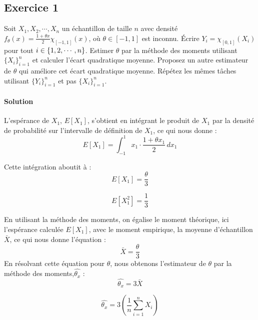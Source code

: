 \documentclass[../main.tex]{subfiles}
\begin{document}
\begin{CJK*}{UTF8}{gbsn}

\section*{Exercice 1}

Soit $X_1, X_2, \cdots, X_n$ un échantillon de taille $n$ avec densité 
$f_{\theta}(x) = \frac{1 + \theta x}{2} \chi_{[-1,1]}(x)$, 
où $\theta \in [-1,1]$ est inconnu. Écrire $Y_i = \chi_{[0,1]}(X_i)$
pour tout $i \in \left \{  1, 2, \cdots, n \right \}$.
Estimer $\theta$ par la méthode des moments utilisant $\{X_i\}_{i=1}^n$ et 
calculer l'écart quadratique moyenne. 
Proposez un autre estimateur de $\theta$ qui améliore cet écart quadratique moyenne.
Répétez les mêmes tâches utilisant $\{Y_i\}_{i=1}^n$ et pas $\{X_i\}_{i=1}^n$.

\paragraph{Solution}

L'espérance de $X_1$, $E[X_1]$, s'obtient en intégrant le produit de $X_1$ par la densité de probabilité sur l'intervalle de définition de $X_1$, ce qui nous donne :
\begin{equation*}
E[X_1] = \int_{-1}^{1} x_1 \cdot \frac{1 + \theta x_1}{2} \, dx_1
\end{equation*}

Cette intégration aboutit à :
\begin{equation*}
E[X_1] = \frac{\theta}{3} 
\end{equation*}

\begin{equation*}
E[X_1^2] = \frac{1}{3} 
\end{equation*}

En utilisant la méthode des moments, on égalise le moment théorique, 
ici l'espérance calculée $E[X_1]$, 
avec le moment empirique, la moyenne d'échantillon $\bar{X}$, ce qui nous donne l'équation :
\begin{equation*}
\bar{X} = \frac{\theta}{3}
\end{equation*}
En résolvant cette équation pour $\theta$, nous obtenons l'estimateur de $\theta$ par la méthode des moments,$\hat{\theta_x}$ :
\begin{equation*}
\hat{\theta_x} = 3\bar{X}
\end{equation*}

\begin{equation*}
\hat{\theta_x} = 3\left(\frac{1}{n}\sum_{i=1}^{n}X_i\right)
\end{equation*}


\end{CJK*}
\end{document}
